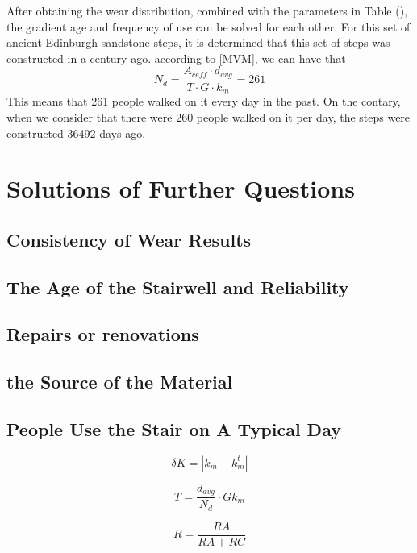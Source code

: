 \documentclass[12pt]{article}  %
\numberwithin{equation}{section} %
\begin{document}
After obtaining the wear distribution, combined with the parameters in Table (), the gradient age and frequency of use can be solved for each other. For this set of ancient Edinburgh sandstone steps, it is determined that this set of steps was constructed in a century ago. according to \autoref{MVM}, we can have that 
\begin{equation}
     N_d = \frac{A_{ceff}\cdot{d_{avg}}}{T\cdot{G}\cdot{k_m}}=261
\end{equation}
 This means that 261 people walked on it every day in the past. On the contary, when we consider that there were 260 people walked on it per day, the steps were constructed 36492 days ago.


\section{Solutions of Further Questions}

\subsection{Consistency of Wear Results}
\subsection{The Age of the Stairwell and Reliability}
\subsection{Repairs or renovations }
\subsection{the Source of the Material}
\subsection{People Use the Stair on A Typical Day}




\begin{equation}
    \delta{K}=\left | k_m-k_m^{t}\right|
\end{equation}

\begin{equation}
    T=\frac{d_{avg}}{N_d}\cdot{G}{k_m}
\end{equation}

\begin{equation}
    R=\frac{RA}{RA+RC}
\end{equation}
\end{document}

